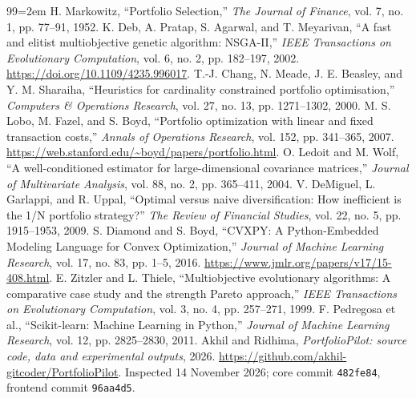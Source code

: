 \documentclass[12pt,a4paper]{article}
\begin{document}
\clearpage
{}
\begin{thebibliography}{99}\small\emergencystretch=2em
 H. Markowitz, ``Portfolio Selection,'' \emph{The Journal of Finance}, vol. 7, no. 1, pp. 77--91, 1952.
 K. Deb, A. Pratap, S. Agarwal, and T. Meyarivan, ``A fast and elitist multiobjective genetic algorithm: NSGA-II,'' \emph{IEEE Transactions on Evolutionary Computation}, vol. 6, no. 2, pp. 182--197, 2002. \url{https://doi.org/10.1109/4235.996017}.
 T.-J. Chang, N. Meade, J. E. Beasley, and Y. M. Sharaiha, ``Heuristics for cardinality constrained portfolio optimisation,'' \emph{Computers \& Operations Research}, vol. 27, no. 13, pp. 1271--1302, 2000.
 M. S. Lobo, M. Fazel, and S. Boyd, ``Portfolio optimization with linear and fixed transaction costs,'' \emph{Annals of Operations Research}, vol. 152, pp. 341--365, 2007. \url{https://web.stanford.edu/~boyd/papers/portfolio.html}.
 O. Ledoit and M. Wolf, ``A well-conditioned estimator for large-dimensional covariance matrices,'' \emph{Journal of Multivariate Analysis}, vol. 88, no. 2, pp. 365--411, 2004.
 V. DeMiguel, L. Garlappi, and R. Uppal, ``Optimal versus naive diversification: How inefficient is the 1/N portfolio strategy?'' \emph{The Review of Financial Studies}, vol. 22, no. 5, pp. 1915--1953, 2009.
 S. Diamond and S. Boyd, ``CVXPY: A Python-Embedded Modeling Language for Convex Optimization,'' \emph{Journal of Machine Learning Research}, vol. 17, no. 83, pp. 1--5, 2016. \url{https://www.jmlr.org/papers/v17/15-408.html}.
 E. Zitzler and L. Thiele, ``Multiobjective evolutionary algorithms: A comparative case study and the strength Pareto approach,'' \emph{IEEE Transactions on Evolutionary Computation}, vol. 3, no. 4, pp. 257--271, 1999.
 F. Pedregosa et al., ``Scikit-learn: Machine Learning in Python,'' \emph{Journal of Machine Learning Research}, vol. 12, pp. 2825--2830, 2011.
 Akhil and Ridhima, \emph{PortfolioPilot: source code, data and experimental outputs}, 2026. \url{https://github.com/akhil-gitcoder/PortfolioPilot}. Inspected 14 November 2026; core commit \texttt{482fe84}, frontend commit \texttt{96aa4d5}.
\end{thebibliography}
\end{document}
